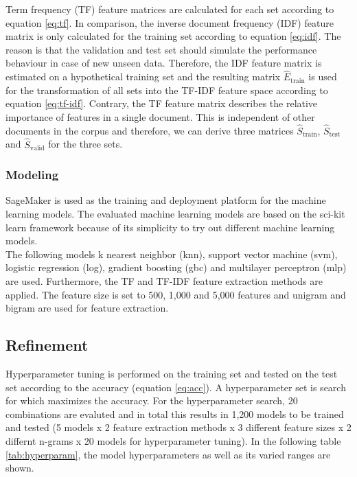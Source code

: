 \documentclass[a4paper,12pt,nottoc]{article}
\begin{document}
\noindent Term frequency (TF) feature matrices are calculated for each set according to equation \ref{eq:tf}. In comparison, the inverse document frequency (IDF) feature matrix is only calculated for the training set according to equation \ref{eq:idf}. The reason is that the validation and test set should simulate the performance behaviour in case of new unseen data. Therefore,  the IDF feature matrix is estimated on a hypothetical training set and the resulting matrix $\hat{E}_{\textrm{train}}$ is used for the transformation of all sets into the TF-IDF feature space according to equation \ref{eq:tf-idf}. Contrary, the TF feature matrix describes the relative importance of features in a single document. This is independent of other documents in the corpus and therefore, we can derive three matrices $\hat{S}_{\textrm{train}}$, $\hat{S}_{\textrm{test}}$ and $\hat{S}_{\textrm{valid}}$ for the three sets.

\subsubsection{Modeling}

\noindent SageMaker \cite{bib:sagemaker} is used as the training and deployment platform for the machine learning models. The evaluated machine learning models are based on the sci-kit learn framework \cite{bib:scikit-learn} because of its simplicity to try out different machine learning models.\\

\noindent The following models k nearest neighbor (knn), support vector machine (svm), logistic regression (log), gradient boosting (gbc) and multilayer perceptron (mlp) are used. Furthermore, the TF and TF-IDF feature extraction methods are applied. The feature size is set to 500, 1,000 and 5,000 features and unigram and bigram are used for feature extraction.

\subsection{Refinement}

Hyperparameter tuning is performed on the training set and tested on the test set according to the accuracy (equation \ref{eq:acc}). A hyperparameter set is search for which maximizes the accuracy. For the hyperparameter search, 20 combinations are evaluted and in total this results in 1,200 models to be trained and tested (5 models x 2 feature extraction methods x 3 different feature sizes x 2 differnt n-grams x 20 models for hyperparameter tuning). In the following table \ref{tab:hyperparam}, the model hyperparameters as well as its varied ranges are shown. 
\end{document}
